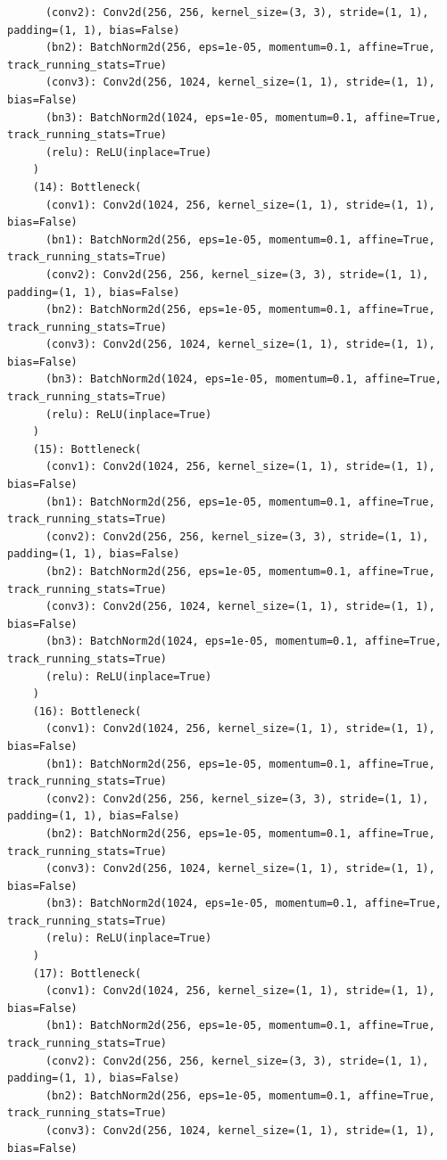 \documentclass{article}
\begin{document}
\begin{verbatim}
      (conv2): Conv2d(256, 256, kernel_size=(3, 3), stride=(1, 1), padding=(1, 1), bias=False)
      (bn2): BatchNorm2d(256, eps=1e-05, momentum=0.1, affine=True, track_running_stats=True)
      (conv3): Conv2d(256, 1024, kernel_size=(1, 1), stride=(1, 1), bias=False)
      (bn3): BatchNorm2d(1024, eps=1e-05, momentum=0.1, affine=True, track_running_stats=True)
      (relu): ReLU(inplace=True)
    )
    (14): Bottleneck(
      (conv1): Conv2d(1024, 256, kernel_size=(1, 1), stride=(1, 1), bias=False)
      (bn1): BatchNorm2d(256, eps=1e-05, momentum=0.1, affine=True, track_running_stats=True)
      (conv2): Conv2d(256, 256, kernel_size=(3, 3), stride=(1, 1), padding=(1, 1), bias=False)
      (bn2): BatchNorm2d(256, eps=1e-05, momentum=0.1, affine=True, track_running_stats=True)
      (conv3): Conv2d(256, 1024, kernel_size=(1, 1), stride=(1, 1), bias=False)
      (bn3): BatchNorm2d(1024, eps=1e-05, momentum=0.1, affine=True, track_running_stats=True)
      (relu): ReLU(inplace=True)
    )
    (15): Bottleneck(
      (conv1): Conv2d(1024, 256, kernel_size=(1, 1), stride=(1, 1), bias=False)
      (bn1): BatchNorm2d(256, eps=1e-05, momentum=0.1, affine=True, track_running_stats=True)
      (conv2): Conv2d(256, 256, kernel_size=(3, 3), stride=(1, 1), padding=(1, 1), bias=False)
      (bn2): BatchNorm2d(256, eps=1e-05, momentum=0.1, affine=True, track_running_stats=True)
      (conv3): Conv2d(256, 1024, kernel_size=(1, 1), stride=(1, 1), bias=False)
      (bn3): BatchNorm2d(1024, eps=1e-05, momentum=0.1, affine=True, track_running_stats=True)
      (relu): ReLU(inplace=True)
    )
    (16): Bottleneck(
      (conv1): Conv2d(1024, 256, kernel_size=(1, 1), stride=(1, 1), bias=False)
      (bn1): BatchNorm2d(256, eps=1e-05, momentum=0.1, affine=True, track_running_stats=True)
      (conv2): Conv2d(256, 256, kernel_size=(3, 3), stride=(1, 1), padding=(1, 1), bias=False)
      (bn2): BatchNorm2d(256, eps=1e-05, momentum=0.1, affine=True, track_running_stats=True)
      (conv3): Conv2d(256, 1024, kernel_size=(1, 1), stride=(1, 1), bias=False)
      (bn3): BatchNorm2d(1024, eps=1e-05, momentum=0.1, affine=True, track_running_stats=True)
      (relu): ReLU(inplace=True)
    )
    (17): Bottleneck(
      (conv1): Conv2d(1024, 256, kernel_size=(1, 1), stride=(1, 1), bias=False)
      (bn1): BatchNorm2d(256, eps=1e-05, momentum=0.1, affine=True, track_running_stats=True)
      (conv2): Conv2d(256, 256, kernel_size=(3, 3), stride=(1, 1), padding=(1, 1), bias=False)
      (bn2): BatchNorm2d(256, eps=1e-05, momentum=0.1, affine=True, track_running_stats=True)
      (conv3): Conv2d(256, 1024, kernel_size=(1, 1), stride=(1, 1), bias=False)

\end{verbatim}
\end{document}
